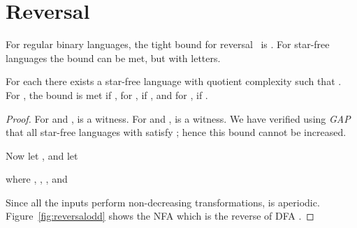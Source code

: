 \documentclass{llncs}
\begin{document}
\section{Reversal}
\label{sec:reversal}
For regular binary languages, the tight bound for reversal~\cite{Lei81}  is . For star-free languages the bound   can be met, but with  letters.

\begin{theorem}
\label{thm:reversal}
For each  there exists a star-free language  with quotient complexity  such that .
For , the bound is met if ,  for , if , and for , if .
\end{theorem}
\begin{proof}
For  and ,  is a witness. 
For  and ,  is a witness. 
We have verified using \emph{GAP} that all star-free languages  with  
satisfy ; hence this bound cannot be increased.

Now let , and let 

 where 
, ,  , and 

Since all the inputs perform non-decreasing transformations,  is 
aperiodic. 
Figure~\ref{fig:reversalodd} shows the NFA  which is the reverse of  DFA .



\end{proof}
\end{document}

